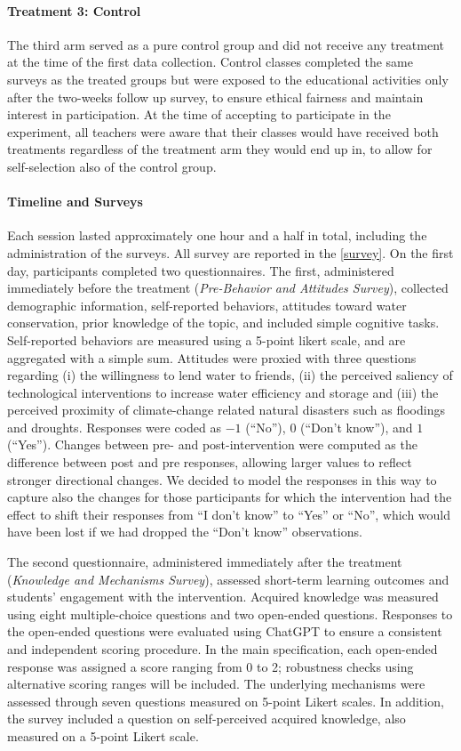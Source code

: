 \documentclass[preprint,12pt]{elsarticle}
\begin{document}
\paragraph{Treatment 3: Control}
The third arm served as a pure control group and did not receive any treatment at the time of the first data collection. Control classes completed the same surveys as the treated groups but were exposed to the educational activities only after the two-weeks follow up survey, to ensure ethical fairness and maintain interest in participation. At the time of accepting to participate in the experiment, all teachers were aware that their classes would have received both treatments regardless of the treatment arm they would end up in, to allow for self-selection also of the control group.


\paragraph{Timeline and Surveys}
Each session lasted approximately one hour and a half in total, including the administration of the surveys. All survey are reported in the \ref{survey}.
On the first day, participants completed two questionnaires. The first, administered immediately before the treatment (\textit{Pre-Behavior and Attitudes Survey}), collected demographic information, self-reported behaviors, attitudes toward water conservation, prior knowledge of the topic, and included simple cognitive tasks. Self-reported behaviors are measured using a 5-point likert scale, and are aggregated with a simple sum. Attitudes were proxied with three questions regarding (i) the willingness to lend water to friends, (ii) the perceived saliency of technological interventions to increase water efficiency and storage and (iii) the perceived proximity of climate-change related natural disasters such as floodings and droughts. Responses were coded as $-1$ (“No”), $0$ (“Don’t know”), and $1$ (“Yes”). Changes between pre- and post-intervention were computed as the difference between post and pre responses, allowing larger values to reflect stronger directional changes. We decided to model the responses in this way to capture also the changes for those participants for which the intervention had the effect to shift their responses from \enquote{I don't know} to \enquote{Yes} or \enquote{No}, which would have been lost if we had dropped the \enquote{Don't know} observations.

The second questionnaire, administered immediately after the treatment (\textit{Knowledge and Mechanisms Survey}), assessed short-term learning outcomes and students’ engagement with the intervention. Acquired knowledge was measured using eight multiple-choice questions and two open-ended questions. Responses to the open-ended questions were evaluated using ChatGPT to ensure a consistent and independent scoring procedure. In the main specification, each open-ended response was assigned a score ranging from 0 to 2; robustness checks using alternative scoring ranges will be included.
The underlying mechanisms were assessed through seven questions measured on 5-point Likert scales. In addition, the survey included a question on self-perceived acquired knowledge, also measured on a 5-point Likert scale.
\end{document}

